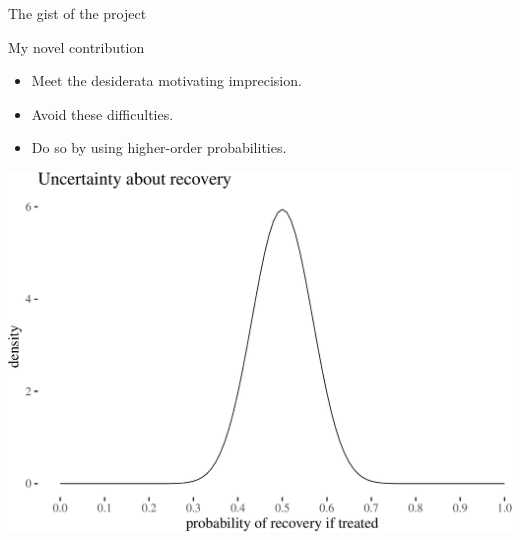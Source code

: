 \documentclass[10pt,ignorenonframetext,x11names, dvipsnames, bibspacing,natbib]{beamer}
\begin{document}
\begin{frame}{The gist of the project}

\begin{block}{My novel contribution}

\begin{itemize}
\item
  Meet the desiderata motivating imprecision.
\item
  Avoid these difficulties.
\item
  Do so by using higher-order probabilities.
\end{itemize}

\begin{center}\includegraphics[width=0.7\linewidth]{presentationESSLLI_files/figure-beamer/unnamed-chunk-1-1} \end{center}

\end{block}

\end{frame}
\end{document}
